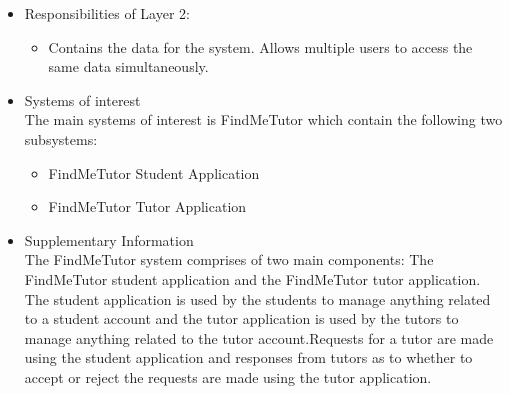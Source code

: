\documentclass[12pt]{article}
\begin{document}
\begin{itemize}
\item Responsibilities of Layer 2:
\begin{itemize}
\item Contains the data for the system. Allows multiple users to access the same data simultaneously.
\end{itemize}

\item Systems of interest\\
The main systems of interest is FindMeTutor which contain the following two subsystems:
\begin{itemize}
\item FindMeTutor Student Application
\item FindMeTutor Tutor Application
\end{itemize}

\item Supplementary Information\\
The FindMeTutor system comprises of two main components: The FindMeTutor student application and the FindMeTutor tutor application. The student application is used by the students to manage anything related to a student account and the tutor application is used by the tutors to manage anything related to the tutor account.Requests for a tutor are made using the student application and responses from tutors as to whether to accept or reject the requests are made using the tutor application.
\end{itemize}

\pagebreak
\end{document}
